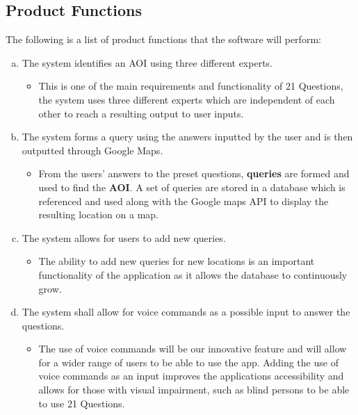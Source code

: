 \documentclass[titlepage]{article}
\newcounter{req}
\begin{document}
		\subsection{Product Functions}
		\label{sub:product_functions}
		The following is a list of product functions that the software will perform:
		\begin{enumerate}[a)]
			\item The system identifies an AOI using three different experts.
			\begin{itemize}
				\item This is one of the main requirements and functionality of 21 Questions, the system uses three different experts which are independent of each other to reach a resulting output to user inputs.
			\end{itemize}
			\item The system forms a query using the answers inputted by the user and is then outputted through Google Maps.
			\begin{itemize}
				\item From the users' answers to the preset questions, \textbf{queries} are formed and used to find the \textbf{AOI}. A set of queries are stored in a database which is referenced and used along with the Google maps API to display the resulting location on a map.
			\end{itemize}
			\item The system allows for users to add new queries.
			\begin{itemize}
				\item The ability to add new queries for new locations is an important functionality of the application as it allows the database to continuously grow.
			\end{itemize}
			\item The system shall allow for voice commands as a possible input to answer the questions.
			\begin{itemize}
				\item The use of voice commands will be our innovative feature and will allow for a wider range of users to be able to use the app. Adding the use of voice commands as an input improves the applications accessibility and allows for those with visual impairment, such as blind persons to be able to use 21 Questions.
			\end{itemize} 
		\end{enumerate}
		
\end{document}
